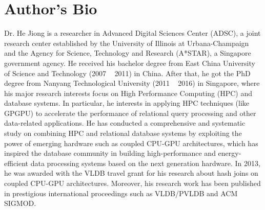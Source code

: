 \section{Author's Bio} \label{sec:bio}

Dr. He Jiong is a researcher in Advanced Digital Sciences Center (ADSC), a joint research center established by the University of Illinois at Urbana-Champaign and the Agency for Science, Technology and Research (A*STAR), a Singapore government agency. He received his bachelor degree from East China University of Science and Technology (2007 ~ 2011) in China. After that, he got the PhD degree from Nanyang Technological University (2011 ~ 2016) in Singapore, where his major research interests focus on High Performance Computing (HPC) and database systems. In particular, he interests in applying HPC techniques (like GPGPU) to accelerate the performance of relational query processing and other data-related applications. He has conducted a comprehensive and systematic study on combining HPC and relational database systems by exploiting the power of emerging hardware such as coupled CPU-GPU architectures, which has inspired the database community in building high-performance and energy-efficient data processing systems based on the next generation hardware. In 2013, he was awarded with the VLDB travel grant for his research about hash joins on coupled CPU-GPU architectures. Moreover, his research work has been published in prestigious international proceedings such as VLDB/PVLDB and ACM SIGMOD.